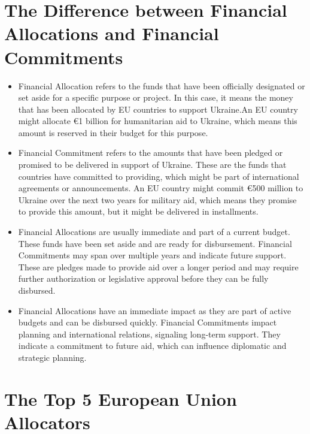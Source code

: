 \documentclass[12pt,preprint, authoryear]{elsarticle}
\numberwithin{equation}{section}
\numberwithin{figure}{section}
\numberwithin{table}{section}
\begin{document}
\hypertarget{the-difference-between-financial-allocations-and-financial-commitments}{%
\section{The Difference between Financial Allocations and Financial
Commitments}\label{the-difference-between-financial-allocations-and-financial-commitments}}

\begin{itemize}
\item
  Financial Allocation refers to the funds that have been officially
  designated or set aside for a specific purpose or project. In this
  case, it means the money that has been allocated by EU countries to
  support Ukraine.An EU country might allocate €1 billion for
  humanitarian aid to Ukraine, which means this amount is reserved in
  their budget for this purpose.
\item
  Financial Commitment refers to the amounts that have been pledged or
  promised to be delivered in support of Ukraine. These are the funds
  that countries have committed to providing, which might be part of
  international agreements or announcements. An EU country might commit
  €500 million to Ukraine over the next two years for military aid,
  which means they promise to provide this amount, but it might be
  delivered in installments.
\item
  Financial Allocations are usually immediate and part of a current
  budget. These funds have been set aside and are ready for
  disbursement. Financial Commitments may span over multiple years and
  indicate future support. These are pledges made to provide aid over a
  longer period and may require further authorization or legislative
  approval before they can be fully disbursed.
\item
  Financial Allocations have an immediate impact as they are part of
  active budgets and can be disbursed quickly. Financial Commitments
  impact planning and international relations, signaling long-term
  support. They indicate a commitment to future aid, which can influence
  diplomatic and strategic planning.
\end{itemize}

\hypertarget{the-top-5-european-union-allocators}{%
\section{The Top 5 European Union
Allocators}\label{the-top-5-european-union-allocators}}
\end{document}
